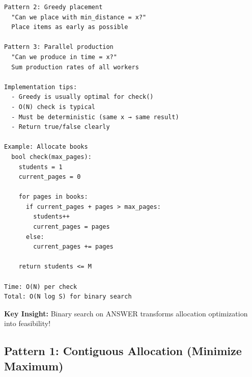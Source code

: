 \documentclass[11pt,a4paper,oneside]{book}
\begin{document}
\begin{tcolorbox}[
    enhanced,breakable,
    colback=white,
    colframe=deepblue,
    boxrule=1.5pt,
    arc=3mm,
    title=\textbf{The Allocation Paradigm}
]
\begin{verbatim}
Pattern 2: Greedy placement
  "Can we place with min_distance = x?"
  Place items as early as possible

Pattern 3: Parallel production
  "Can we produce in time = x?"
  Sum production rates of all workers

Implementation tips:
  - Greedy is usually optimal for check()
  - O(N) check is typical
  - Must be deterministic (same x → same result)
  - Return true/false clearly

Example: Allocate books
  bool check(max_pages):
    students = 1
    current_pages = 0
    
    for pages in books:
      if current_pages + pages > max_pages:
        students++
        current_pages = pages
      else:
        current_pages += pages
    
    return students <= M

Time: O(N) per check
Total: O(N log S) for binary search
\end{verbatim}

\textbf{Key Insight:}
Binary search on ANSWER transforms allocation optimization into feasibility!
\end{tcolorbox}

\subsection{Pattern 1: Contiguous Allocation (Minimize Maximum)}
\end{document}
